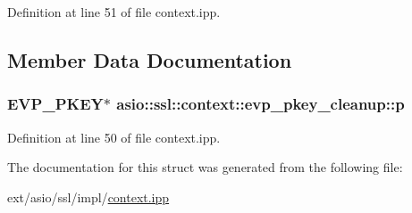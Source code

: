 Definition at line 51 of file context.\+ipp.



\subsection{Member Data Documentation}
\hypertarget{structasio_1_1ssl_1_1context_1_1evp__pkey__cleanup_adb5b4e51be65a745a822a469eecf46f1}{}
\subsubsection[{p}]{\setlength{\rightskip}{0pt plus 5cm}E\+V\+P\+\_\+\+P\+K\+E\+Y$\ast$ asio\+::ssl\+::context\+::evp\+\_\+pkey\+\_\+cleanup\+::p}\label{structasio_1_1ssl_1_1context_1_1evp__pkey__cleanup_adb5b4e51be65a745a822a469eecf46f1}


Definition at line 50 of file context.\+ipp.



The documentation for this struct was generated from the following file\+:\begin{DoxyCompactItemize}
\item 
ext/asio/ssl/impl/\hyperlink{context_8ipp}{context.\+ipp}\end{DoxyCompactItemize}
